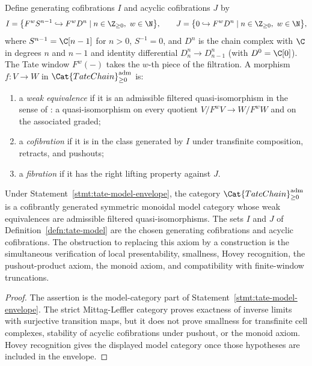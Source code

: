 \begin{defn}
  \label{defn:tate-model}
  Define generating cofibrations $I$ and acyclic cofibrations $J$
  by
  $$I=\bigl\{F^w S^{n-1}\hookrightarrow F^w D^n
       \mid n\in\Z_{\geq 0},\ w\in\N\bigr\},\qquad
    J=\bigl\{0\hookrightarrow F^w D^n
       \mid n\in\Z_{\geq 0},\ w\in\N\bigr\},$$
  where \(S^{n-1}=\C[n-1]\) for \(n>0\), \(S^{-1}=0\), and \(D^n\)
  is the chain complex with \(\C\) in degrees \(n\) and \(n-1\) and
  identity differential \(D^n_n\to D^n_{n-1}\) (with \(D^0=\C[0]\)).
  The Tate window \(F^w(-)\) takes the
  $w$-th piece of the filtration. A morphism $f\colon V\to W$ in
  $\Cat{TateChain}_{\geq 0}^{\mathrm{adm}}$ is:
  \begin{enumerate}
    \item a \emph{weak equivalence} if it is an admissible filtered
      quasi-isomorphism in the sense of \alpharef:
      a quasi-isomorphism on every quotient $V/F^wV\to W/F^wW$ and
      on the associated graded;
    \item a \emph{cofibration} if it is in the class generated by
      $I$ under transfinite composition, retracts, and pushouts;
    \item a \emph{fibration} if it has the right lifting property
      against $J$.
  \end{enumerate}
\end{defn}

\begin{thm}
  \label{thm:tate-model-structure}
  Under Statement~\ref{stmt:tate-model-envelope}, the category
  \(\Cat{TateChain}_{\geq 0}^{\mathrm{adm}}\) is a cofibrantly generated
  symmetric monoidal model category whose weak equivalences are
  admissible filtered quasi-isomorphisms.  The sets \(I\) and \(J\) of
  Definition~\ref{defn:tate-model} are the chosen generating
  cofibrations and acyclic cofibrations.  The obstruction to replacing
  this axiom by a construction is the simultaneous verification of
  local presentability, smallness, Hovey recognition, the pushout-product
  axiom, the monoid axiom, and compatibility with finite-window
  truncations.
\end{thm}

\begin{proof}
  The assertion is the model-category part of
  Statement~\ref{stmt:tate-model-envelope}.  The strict
  Mittag-Leffler category proves exactness of inverse limits with
  surjective transition maps, but it does not prove smallness for
  transfinite cell complexes, stability of acyclic cofibrations under
  pushout, or the monoid axiom.  Hovey recognition gives the displayed
  model category once those hypotheses are included in the envelope.
\end{proof}

